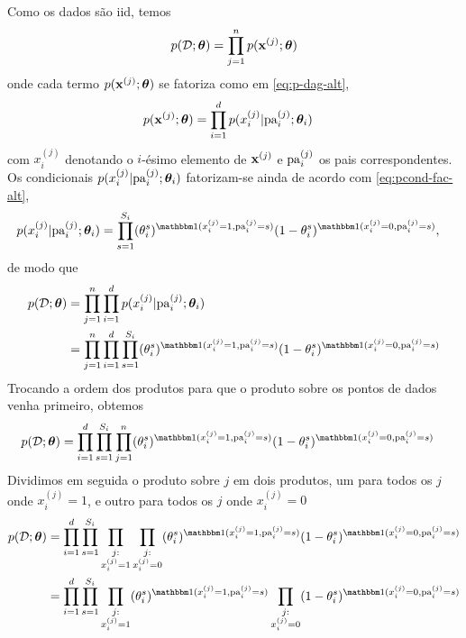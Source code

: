 \begin{exenumerate}
    \begin{solution}
        Como os dados s\~ao iid, temos
        \begin{align}
            p(\mathcal{D}; \boldsymbol{\theta}) & = \prod_{j=1}^n p(\mathbf{x}^{(j)}; \boldsymbol{\theta}) \\
        \end{align}
        onde cada termo $p(\mathbf{x}^{(j)}; \boldsymbol{\theta})$ se fatoriza como em \eqref{eq:p-dag-alt},
        \begin{align}
            p(\mathbf{x}^{(j)}; \boldsymbol{\theta}) &= \prod_{i=1}^d p(x_i^{(j)} | \mathrm{pa}_i^{(j)}; \boldsymbol{\theta}_i)
        \end{align}
        com $x_i^{(j)}$ denotando o $i$-\'esimo elemento de $\mathbf{x}^{(j)}$ e $\mathrm{pa}_i^{(j)}$ os pais correspondentes. Os condicionais $p(x_i^{(j)} | \mathrm{pa}_i^{(j)}; \boldsymbol{\theta}_i)$ fatorizam-se ainda de acordo com \eqref{eq:pcond-fac-alt},
        \begin{align}
            p(x_i^{(j)} | \pa_i^{(j)}; \thetab_i) &= \prod_{s=1}^{S_i} (\theta_i^s)^{\ind(x_i^{(j)}=1, \pa_i^{(j)}=s)} (1-\theta_i^s)^{\ind(x_i^{(j)}=0, \pa_i^{(j)}=s)},
        \end{align}
        de modo que
        \begin{align}
            p(\data; \thetab) & = \prod_{j=1}^n \prod_{i=1}^d p(x_i^{(j)} | \pa_i^{(j)}; \thetab_i)\\
            & =  \prod_{j=1}^n  \prod_{i=1}^d \prod_{s=1}^{S_i} (\theta_i^s)^{\ind(x_i^{(j)}=1, \pa_i^{(j)}=s)} (1-\theta_i^s)^{\ind(x_i^{(j)}=0, \pa_i^{(j)}=s)}
        \end{align}
        Trocando a ordem dos produtos para que o produto sobre os pontos de dados venha primeiro, obtemos
        \begin{align}
            p(\data; \thetab)  & = \prod_{i=1}^d \prod_{s=1}^{S_i} \prod_{j=1}^n(\theta_i^s)^{\ind(x_i^{(j)}=1, \pa_i^{(j)}=s)} (1-\theta_i^s)^{\ind(x_i^{(j)}=0, \pa_i^{(j)}=s)}
        \end{align}
        Dividimos em seguida o produto sobre $j$ em dois produtos, um para todos os $j$ onde $x_i^{(j)}=1$, e outro para todos os $j$ onde $x_i^{(j)}=0$
        \begin{align}
            p(\data; \thetab)   &=  \prod_{i=1}^d \prod_{s=1}^{S_i} \prod_{\substack{j: \\x_i^{(j)}=1}}\prod_{\substack{j: \\x_i^{(j)}=0}} (\theta_i^s)^{\ind(x_i^{(j)}=1, \pa_i^{(j)}=s)} (1-\theta_i^s)^{\ind(x_i^{(j)}=0, \pa_i^{(j)}=s)}\\
            &=  \prod_{i=1}^d \prod_{s=1}^{S_i} \prod_{\substack{j: \\x_i^{(j)}=1}} (\theta_i^s)^{\ind(x_i^{(j)}=1, \pa_i^{(j)}=s)} \prod_{\substack{j: \\x_i^{(j)}=0}}(1-\theta_i^s)^{\ind(x_i^{(j)}=0, \pa_i^{(j)}=s)}\\

\end{align}
\end{solution}
\end{exenumerate}
